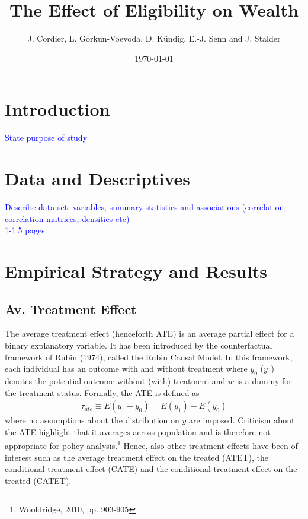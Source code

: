 \documentclass{article}
\title{The Effect of Eligibility on Wealth}
\author{J. Cordier, L. Gorkun-Voevoda, D. Kündig, E.-J. Senn and J. Stalder}
\date{\today}
\begin{document}
\maketitle



\section{Introduction}

\textcolor{blue}{State purpose of study}

\newpage

\section{Data and Descriptives}

\textcolor{blue}{Describe data set: variables, summary statistics and associations (correlation, correlation matrices, densities etc)\\
1-1.5 pages}


\newpage
\section{Empirical Strategy and Results}


\subsection{Av. Treatment Effect}

The average treatment effect (henceforth ATE) is an average partial effect for a binary explanatory variable. It has been introduced by the counterfactual framework of Rubin (1974), called the Rubin Causal Model. In this framework, each individual has an outcome with and without treatment where $y_0$ ($y_1$) denotes the potential outcome without (with) treatment and $w$ is a dummy for the treatment status. Formally, the ATE is defined as  
\begin{align}
    \tau_{ate} \equiv E(y_1 - y_0) =E(y_1) - E(y_0)
    \label{ate}
\end{align}
where no assumptions about the distribution on $y$ are imposed. Criticism about the ATE highlight that it averages across population and is therefore not appropriate for policy analysis.\footnote{Wooldridge, 2010, pp. 903-905} Hence, also other treatment effects have been of interest such as the average treatment effect on the treated (ATET), the conditional treatment effect (CATE) and the conditional treatment effect on the treated (CATET).\newline
\end{document}
